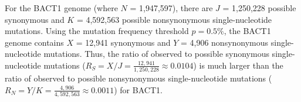For the BACT1 genome
(where $N$ = 1,947,597),
there are $J$ = 1,250,228 possible synonymous and
$K$ = 4,592,563 possible nonsynonymous single-nucleotide mutations.
%
Using the mutation frequency threshold $p = 0.5\%$,
the BACT1 genome contains
$X$ = 12,941 synonymous and
$Y$ = 4,906 nonsynonymous single-nucleotide mutations.
%
Thus, the ratio of observed to possible synonymous single-nucleotide mutations
($R_S = X / J = \frac{12,941}{1,250,228}
\approx 0.0104$)
is much larger than the ratio of observed to possible nonsynonymous single-nucleotide mutations
($R_N = Y / K = \frac{4,906}{4,592,563}
\approx 0.0011$)
for BACT1.
\endinput